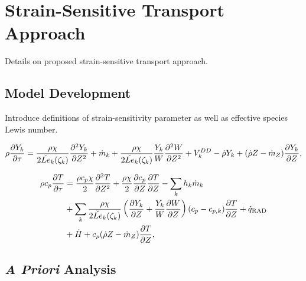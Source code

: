 \section{Strain-Sensitive Transport Approach}
\label{sec:transport:ssta}

Details on proposed strain-sensitive transport approach.


\subsection{Model Development}
\label{sec:transport:ssta:framework}

Introduce definitions of strain-sensitivity parameter as well as effective species Lewis number.


\begin{equation}\label{eq:transport:ssta:framework:flamelety}
  \rho\pder[Y_k]{\tau} = \frac{\rho\chi}{2 \check{Le}_k(\zeta_k)}\sder[Y_k]{Z} + \dot{m}_k + \frac{\rho\chi}{2 \check{Le}_k(\zeta_k)}\frac{Y_k}{W}\sder[W]{Z} + V_k^{DD} - \dot{\rho}Y_k + (\dot{\rho}Z - \dot{m}_Z)\pder[Y_k]{Z},
\end{equation}

\begin{equation}\label{eq:transport:ssta:framework:flamelett}
  \begin{split}
    \rho c_p \pder[T]{\tau} &= \frac{\rho c_p \chi}{2}\sder[T]{Z} + \frac{\rho\chi}{2}\pder[c_p]{Z}\pder[T]{Z} - \sum\limits_{k} h_k\dot{m}_k \\
    &+ \sum\limits_{k} \frac{\rho\chi}{2 \check{Le}_k(\zeta_k)}\left( \pder[Y_k]{Z} + \frac{Y_k}{W}\pder[W]{Z} \right)(c_p - c_{p,k})\pder[T]{Z} + \dot{q}_{\text{RAD}} \\
    &+ \dot{H} + c_p(\dot{\rho}Z - \dot{m}_Z)\pder[T]{Z},
  \end{split}
\end{equation}


\subsection{\textit{A Priori} Analysis}
\label{sec:transport:ssta:dns}

